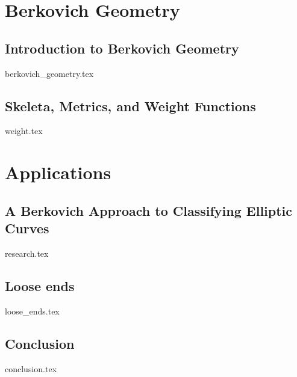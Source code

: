 \part{Berkovich Geometry}\label{part:berkovich}
\chapter{Introduction to Berkovich Geometry} \label{chap:intro_berkovich}
{berkovich_geometry.tex}


\chapter{Skeleta, Metrics, and Weight Functions} \label{chap:weight_functions}
{weight.tex}

\part{Applications}\label{part:research}
\chapter[Berkovich Approach to Elliptic Curves]{A Berkovich Approach to Classifying Elliptic Curves} \label{chap:a_berkovich_approach_to_classifying_elliptic_curves}
{research.tex}

\chapter{Loose ends} \label{chap:loose_ends}
{loose_ends.tex}
\chapter{Conclusion} \label{chap:conclusion}
{conclusion.tex}

\pagebreak
\printbibliography


